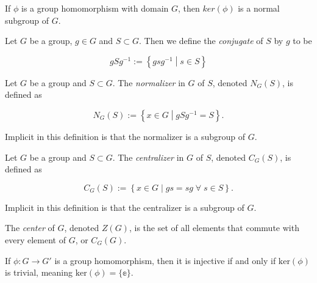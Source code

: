 \begin{theorem}
    \label{theorem : Kernel_normal}
    \leanok
    If $\phi$ is a group homomorphism with domain $G$, then $ker(\phi)$ is a normal subgroup of $G$.
\end{theorem}

\begin{definition}
    \label{definition : Conjugate}
    \leanok
    Let $G$ be a group, $g \in G$ and $S \subset G$. Then we define the \emph{conjugate} of $S$ by $g$ to be

    \begin{equation*}
        gSg^{-1} := \left\{ gsg^{-1} \middle| s \in S \right\}
    \end{equation*}
\end{definition}

\begin{definition}
    \label{definition : Normalizer}
    \leanok
    Let $G$ be a group and $S \subset G$. The \textit{normalizer} in $G$ of $S$, denoted $N_G(S)$, is defined as

    $$N_G(S) := \left\{ x \in G \middle| gSg^{-1} = S \right\}.$$

    Implicit in this definition is that the normalizer is a subgroup of $G$.
\end{definition}

\begin{definition}
    \label{definition : Centralizer}
    \leanok
    Let $G$ be a group and $S \subset G$. The \textit{centralizer} in $G$ of $S$, denoted $C_G(S)$, is defined as

    $$C_G(S) := \left\{ x \in G \middle| gs = sg\;\forall\;s \in S\right\}.$$

    Implicit in this definition is that the centralizer is a subgroup of $G$.
\end{definition}

\begin{definition}
    \label{definition : Center}
    \leanok
    The \textit{center} of $G$, denoted $Z(G)$, is the set of all elements that commute with every element of $G$, or $C_G(G)$.
\end{definition}

\begin{theorem}
    \label{theorem : homomorphism_inj_iff_kernel_trivial}
    \leanok
    If $\phi : G \rightarrow G'$ is a group homomorphism, then it is injective if and only if $\text{ker}(\phi)$ is trivial, meaning $\text{ker}(\phi) = \{\mathbb{e}\}$.
\end{theorem}

